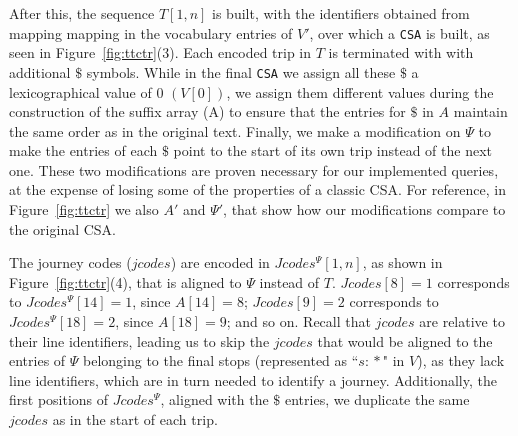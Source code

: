 \documentclass[runningheads]{llncs}
\newcommand{\ttctr}{TTCTR}
\begin{document}
After this, the sequence $T[1,n]$ is built, with the identifiers obtained from mapping mapping in the vocabulary entries of $V'$, over which a \texttt{CSA} is built, as seen in Figure~\ref{fig:ttctr}(3). Each encoded trip in $T$ is terminated with with additional $\$$ symbols. While in the final \texttt{CSA} we assign all these $\$$ a lexicographical value of 0 $(V[0])$, we assign them different values during the construction of the suffix array (A) to ensure that the entries for $\$$ in $A$ maintain the same order as in the original text. Finally, we make a modification on $\Psi$ to make the entries of each $\$$ point to the start of its own trip instead of the next one. These two modifications are proven necessary for our implemented queries, at the expense of losing some of the properties of a classic CSA. For reference, in Figure~\ref{fig:ttctr} we also $A'$ and $\Psi'$, that show how our modifications compare to the original CSA.

The journey codes ($jcodes$) are encoded in $Jcodes^{\Psi}[1,n]$, as shown in Figure~\ref{fig:ttctr}(4), that is aligned to $\Psi$ instead of $T$. $Jcodes[8]= 1$ corresponds to $Jcodes^{\Psi}[14]=1$, since $A[14]=8$; $Jcodes[9]= 2$ corresponds to $Jcodes^{\Psi}[18]=2$, since $A[18]=9$; and so on. Recall that $jcodes$ are relative to their line identifiers, leading us to skip the $jcodes$ that would be aligned to the entries of $\Psi$ belonging to the final stops (represented as ``$s\!:\!*$" in $V$), as they lack line identifiers, which are in turn needed to identify a journey. Additionally, the first positions of $Jcodes^{\Psi}$, aligned with the $\$$ entries, we duplicate the same $jcodes$ as in the start of each trip.

\end{document}
